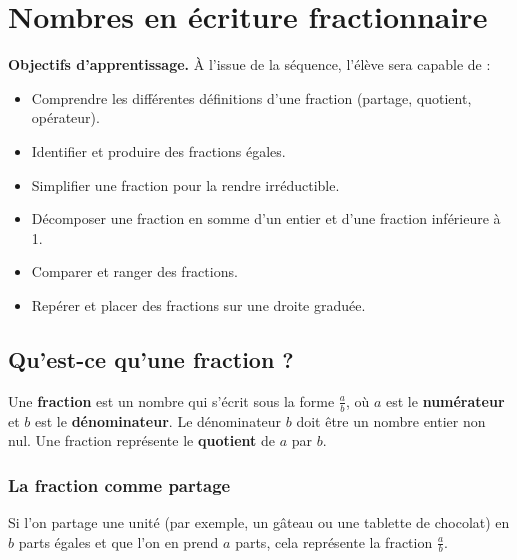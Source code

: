 \chapter{Nombres en écriture fractionnaire}

\begin{objectifsbox}
\textbf{Objectifs d'apprentissage.} À l'issue de la séquence, l'élève sera capable de :
\begin{itemize}
  \item Comprendre les différentes définitions d'une fraction (partage, quotient, opérateur).
  \item Identifier et produire des fractions égales.
  \item Simplifier une fraction pour la rendre irréductible.
  \item Décomposer une fraction en somme d'un entier et d'une fraction inférieure à 1.
  \item Comparer et ranger des fractions.
  \item Repérer et placer des fractions sur une droite graduée.
\end{itemize}
\end{objectifsbox}

\section{Qu'est-ce qu'une fraction ?}

\begin{definitionbox}
  Une \textbf{fraction} est un nombre qui s'écrit sous la forme $\frac{a}{b}$, où $a$ est le \textbf{numérateur} et $b$ est le \textbf{dénominateur}. Le dénominateur $b$ doit être un nombre entier non nul.
  Une fraction représente le \textbf{quotient} de $a$ par $b$.
\end{definitionbox}

\subsection{La fraction comme partage}
\begin{examplebox}
  Si l'on partage une unité (par exemple, un gâteau ou une tablette de chocolat) en $b$ parts égales et que l'on en prend $a$ parts, cela représente la fraction $\frac{a}{b}$.
  \begin{center}
  \end{center}
\end{examplebox}

